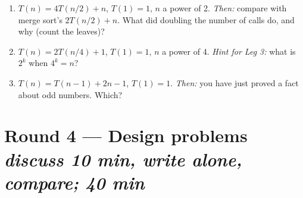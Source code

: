 \documentclass{fkt-notes}
\begin{document}
\begin{enumerate}[label=\textbf{3.\arabic*},leftmargin=2.5em]
  \item $T(n)=4T(n/2)+n$, $T(1)=1$, $n$ a power of 2. \emph{Then:} compare with merge sort's $2T(n/2)+n$. What did doubling the number of calls do, and why (count the leaves)?
  \item $T(n)=2T(n/4)+1$, $T(1)=1$, $n$ a power of 4. \emph{Hint for Leg 3:} what is $2^k$ when $4^k=n$?
  \item $T(n)=T(n-1)+2n-1$, $T(1)=1$. \emph{Then:} you have just proved a fact about odd numbers. Which?
\end{enumerate}

\section*{Round 4 --- Design problems \hfill\normalsize\emph{discuss 10 min, write alone, compare; 40 min}}
\end{document}
